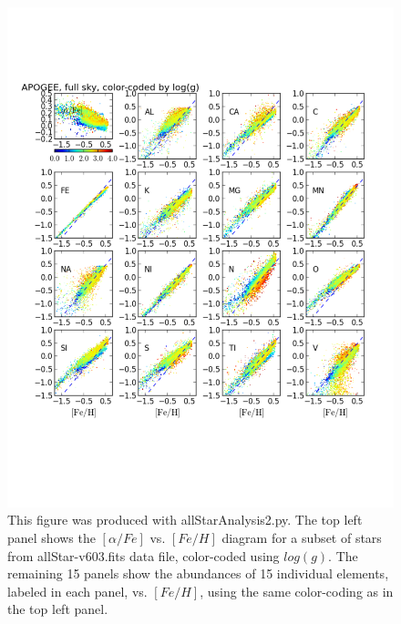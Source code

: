 \documentclass[12pt,preprint]{aastex}
\begin{document}
\begin{figure}
  \centering
  \includegraphics[width=\textwidth]{apogee2.pdf}
  \vskip -1.5in
  \caption{
    This figure was produced with allStarAnalysis2.py. The top left panel shows the $[\alpha/Fe]$ vs. 
$[Fe/H]$ diagram for a subset of stars from allStar-v603.fits data file, color-coded using $log(g)$. 
The remaining 15 panels show the abundances of 15 individual elements, labeled in each panel, 
vs. $[Fe/H]$, using the same color-coding as in the top left panel. 
  }
  \label{basic_example2}
\end{figure}
\end{document}
